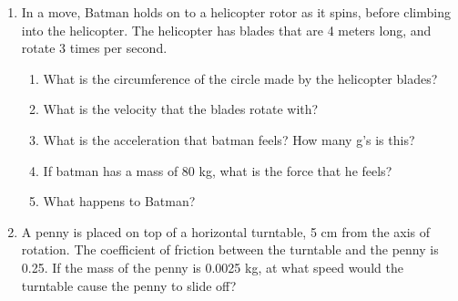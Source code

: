 \documentclass[letterpaper, 12pt]{article}
\begin{document}
\begin{enumerate}
	\item In a move, Batman holds on to a helicopter rotor as it spins, before climbing into the helicopter. The helicopter has blades that are 4 meters long, and rotate 3 times per second.  
	\begin{enumerate}
		\item What is the circumference of the circle made by the helicopter blades?   
			\vspace{0.75in}
		\item 	What is the velocity that the blades rotate with?		
			\vspace{0.75in}
		\item What is the acceleration that batman feels?  How many g's is this?
			\vspace{0.75in}
		\item If batman has a mass of 80 kg, what is the force that he feels?
			\vspace{0.75in}
		\item What happens to Batman?	
			\vspace{0.75in}
	\end{enumerate}
	
	\item A penny is placed on top of a horizontal turntable, 5 cm from the axis of rotation.  The coefficient of friction between the turntable and the penny is 0.25.  If the mass of the penny is 0.0025 kg, at what speed would the turntable cause the penny to slide off?
	



\end{enumerate}
 
\end{document}

